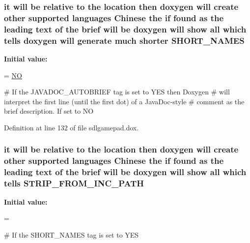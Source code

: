 \hypertarget{sdlgamepad_8dox_a8b98f3c06d38ae31f6e77655f4e4bf0a}{
\subsubsection[{S\-H\-O\-R\-T\-\_\-\-N\-A\-M\-E\-S}]{\setlength{\rightskip}{0pt plus 5cm}it will be relative to the {\bf location} then doxygen will create other supported languages {\bf Chinese} the {\bf if} found as the leading text of the brief will be doxygen will show all which tells doxygen will generate much shorter S\-H\-O\-R\-T\-\_\-\-N\-A\-M\-E\-S}}\label{sdlgamepad_8dox_a8b98f3c06d38ae31f6e77655f4e4bf0a}
{\bfseries Initial value\-:}
\begin{DoxyCode}
= \hyperlink{sdlgamepad_8dox_a0f6a46245280dc38baf9600906aa1393}{NO}

\textcolor{preprocessor}{# If the JAVADOC\_AUTOBRIEF tag is set to YES then Doxygen}
\textcolor{preprocessor}{}\textcolor{preprocessor}{# will interpret the first line (until the first dot) of a JavaDoc-style}
\textcolor{preprocessor}{# comment as the brief description. If set to NO}
\end{DoxyCode}


Definition at line 132 of file sdlgamepad.\-dox.

\hypertarget{sdlgamepad_8dox_a6d297e0f2850b59accd7903a23e2ecff}{
\subsubsection[{S\-T\-R\-I\-P\-\_\-\-F\-R\-O\-M\-\_\-\-I\-N\-C\-\_\-\-P\-A\-T\-H}]{\setlength{\rightskip}{0pt plus 5cm}it will be relative to the {\bf location} then doxygen will create other supported languages {\bf Chinese} the {\bf if} found as the leading text of the brief will be doxygen will show all which tells S\-T\-R\-I\-P\-\_\-\-F\-R\-O\-M\-\_\-\-I\-N\-C\-\_\-\-P\-A\-T\-H}}\label{sdlgamepad_8dox_a6d297e0f2850b59accd7903a23e2ecff}
{\bfseries Initial value\-:}
\begin{DoxyCode}
=

\textcolor{preprocessor}{# If the SHORT\_NAMES tag is set to YES}
\end{DoxyCode}


